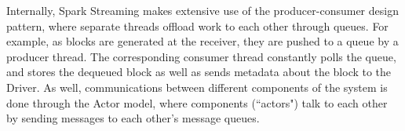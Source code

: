 Internally, Spark Streaming makes extensive use of the producer-consumer design pattern, where separate threads offload work to each other through queues. For example, as blocks are generated at the receiver, they are pushed to a queue by a producer thread. The corresponding consumer thread constantly polls the queue, and stores the dequeued block as well as sends metadata about the block to the Driver. As well, communications between different components of the system is done through the Actor model, where components (``actors") talk to each other by sending messages to each other's message queues.

